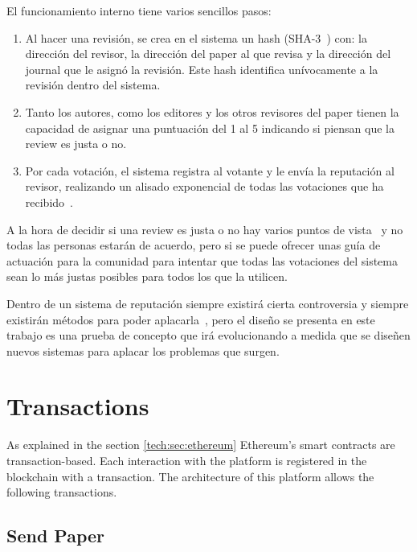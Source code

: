 El funcionamiento interno tiene varios sencillos pasos:
\begin{enumerate}
\item Al hacer una revisión, se crea en el sistema un hash
  (SHA-3~\cite{aumasson2008sha}) con: la dirección del revisor, la dirección del
  paper al que revisa y la dirección del journal que le asignó la revisión. Este
  hash identifica unívocamente a la revisión dentro del sistema.
\item Tanto los autores, como los editores y los otros revisores del paper
  tienen la capacidad de asignar una puntuación del 1 al 5 indicando si piensan
  que la review es justa o no.
\item Por cada votación, el sistema registra al votante y le envía la reputación
  al revisor, realizando un alisado exponencial de todas las votaciones que ha
  recibido~\cite{gardner1985exponential}.
\end{enumerate}

A la hora de decidir si una review es justa o no hay varios puntos de
vista~\cite{daniel1993guardians,cole1979fair} y no todas las personas estarán de
acuerdo, pero si se puede ofrecer unas guía de actuación para la comunidad para
intentar que todas las votaciones del sistema sean lo más justas posibles para
todos los que la utilicen.

Dentro de un sistema de reputación siempre existirá cierta controversia y
siempre existirán métodos para poder aplacarla~\cite{dellarocas2000immunizing},
pero el diseño se presenta en este trabajo es una prueba de concepto que irá
evolucionando a medida que se diseñen nuevos sistemas para aplacar los problemas
que surgen.

\section{Transactions}

As explained in the section \ref{tech:sec:ethereum} Ethereum's smart contracts
are transaction-based. Each interaction with the platform is registered in the
blockchain with a transaction. The architecture of  this platform allows the
following transactions.

\subsection*{Send Paper}
\subsection*{}

